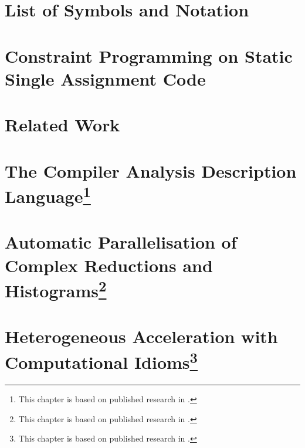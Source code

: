 \documentclass[phd,icsa,twoside,logo,11pt]{infthesis}
\begin{document}
\chapter*{}
\makeatletter
\@openrighttrue
\makeatother

\makeatletter
\@openrightfalse
\makeatother
\chapter*{List of Symbols and Notation}
    
\makeatletter
\@openrighttrue
\makeatother

\chapter{Constraint Programming on Static Single Assignment Code}
    \label{chapter:theory}
    

\chapter{Related Work}
    \label{chapter:literature}
    

\chapter[The Compiler Analysis Description Language]
        {The Compiler Analysis Description
         Language\footnote{This chapter is based on published research in
                           \citet{Ginsbach:2018:CDS:3178372.3179515}.}}
    \label{chapter:candl}
    

\chapter[Automatic Parallelisation of Complex Reductions and Histograms]
        {Automatic Parallelisation of Complex Reductions and
         Histograms\footnote{This chapter is based on published research in
                            \citet{ginsbach2017discovery}.}}
    \label{chapter:reductions}
    

\chapter[Heterogeneous Acceleration with Computational Idioms]
        {Heterogeneous Acceleration with Computational
         Idioms\footnote{This chapter is based on published research in
                         \citet{Ginsbach:2018:AML:3173162.3173182}.}}
    \label{chapter:idioms}
    
\end{document}
